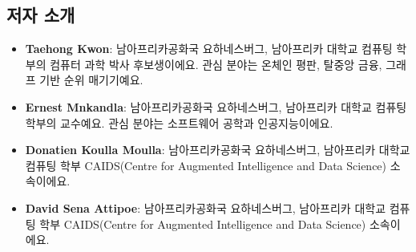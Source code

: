 \subsection*{저자 소개}
\begin{itemize}
\item \textbf{Taehong Kwon}: 남아프리카공화국 요하네스버그, 남아프리카 대학교 컴퓨팅 학부의 컴퓨터 과학 박사 후보생이에요. 관심 분야는 온체인 평판, 탈중앙 금융, 그래프 기반 순위 매기기예요.
\item \textbf{Ernest Mnkandla}: 남아프리카공화국 요하네스버그, 남아프리카 대학교 컴퓨팅 학부의 교수예요. 관심 분야는 소프트웨어 공학과 인공지능이에요.
\item \textbf{Donatien Koulla Moulla}: 남아프리카공화국 요하네스버그, 남아프리카 대학교 컴퓨팅 학부 CAIDS(Centre for Augmented Intelligence and Data Science) 소속이에요.
\item \textbf{David Sena Attipoe}: 남아프리카공화국 요하네스버그, 남아프리카 대학교 컴퓨팅 학부 CAIDS(Centre for Augmented Intelligence and Data Science) 소속이에요.
\end{itemize}
